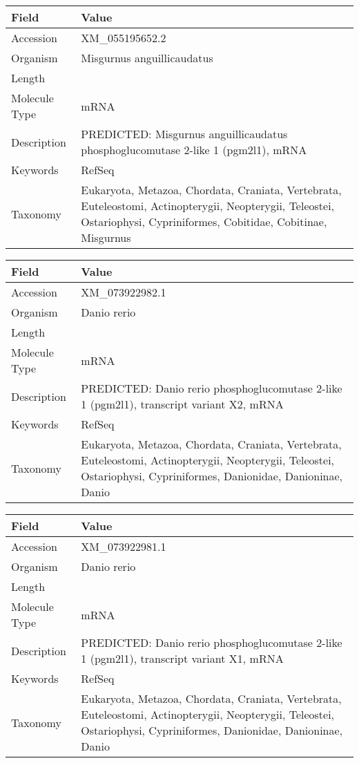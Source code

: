 \documentclass[10pt]{article}
\begin{document}
{\footnotesize
\begin{longtable}{>{\raggedright\arraybackslash}p{4.5cm} >{\raggedright\arraybackslash}p{11.5cm}}
\textbf{Field} & \textbf{Value} \\
\hline
Accession & XM\_055195652.2 \\
Organism & Misgurnus anguillicaudatus \\
Length & 2746 \\
Molecule Type & mRNA \\
Description & PREDICTED: Misgurnus anguillicaudatus phosphoglucomutase 2-like 1 (pgm2l1), mRNA \\
Keywords & RefSeq \\
Taxonomy & Eukaryota, Metazoa, Chordata, Craniata, Vertebrata, Euteleostomi, Actinopterygii, Neopterygii, Teleostei, Ostariophysi, Cypriniformes, Cobitidae, Cobitinae, Misgurnus \\
\end{longtable}
}

{\footnotesize
\begin{longtable}{>{\raggedright\arraybackslash}p{4.5cm} >{\raggedright\arraybackslash}p{11.5cm}}
\textbf{Field} & \textbf{Value} \\
\hline
Accession & XM\_073922982.1 \\
Organism & Danio rerio \\
Length & 6382 \\
Molecule Type & mRNA \\
Description & PREDICTED: Danio rerio phosphoglucomutase 2-like 1 (pgm2l1), transcript variant X2, mRNA \\
Keywords & RefSeq \\
Taxonomy & Eukaryota, Metazoa, Chordata, Craniata, Vertebrata, Euteleostomi, Actinopterygii, Neopterygii, Teleostei, Ostariophysi, Cypriniformes, Danionidae, Danioninae, Danio \\
\end{longtable}
}

{\footnotesize
\begin{longtable}{>{\raggedright\arraybackslash}p{4.5cm} >{\raggedright\arraybackslash}p{11.5cm}}
\textbf{Field} & \textbf{Value} \\
\hline
Accession & XM\_073922981.1 \\
Organism & Danio rerio \\
Length & 3789 \\
Molecule Type & mRNA \\
Description & PREDICTED: Danio rerio phosphoglucomutase 2-like 1 (pgm2l1), transcript variant X1, mRNA \\
Keywords & RefSeq \\
Taxonomy & Eukaryota, Metazoa, Chordata, Craniata, Vertebrata, Euteleostomi, Actinopterygii, Neopterygii, Teleostei, Ostariophysi, Cypriniformes, Danionidae, Danioninae, Danio \\
\end{longtable}
}
\end{document}
